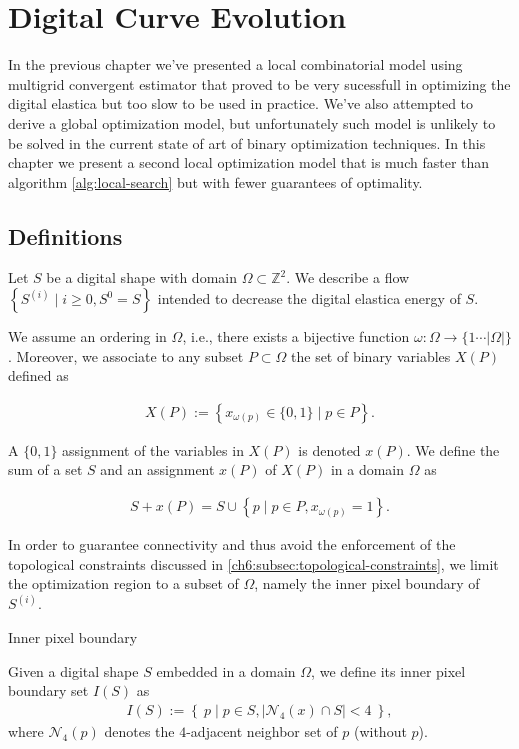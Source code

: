 \chapter{Digital Curve Evolution}
\label{chapter:digital-curve-evolution}

In the previous chapter we've presented a local combinatorial model using multigrid convergent estimator that proved to be very sucessfull in optimizing the digital elastica but too slow to be used in practice. We've also attempted to derive a global optimization model, but unfortunately such model is unlikely to be solved in the current state of art of binary optimization techniques. In this chapter we present a second local optimization model that is much faster than algorithm \ref{alg:local-search} but with fewer guarantees of optimality.

\section{Definitions}

Let $S$ be a digital shape with domain $\Omega \subset \mathbb{Z}^2$. We describe a flow $\left \{ S^{(i)} \; | \; i \geq 0, S^{0} = S \right\}$ intended to decrease the digital elastica energy of $S$.

We assume an ordering in $\Omega$, i.e., there exists a bijective function $\omega : \Omega \rightarrow \{1 \cdots |\Omega| \}$. Moreover, we associate to any subset $P \subset \Omega$ the set of binary variables $X(P)$ defined as

\begin{align*}
	X(P) := \left\{ x_{\omega(p)} \in \{0,1\} \; | \; p \in P \right\}.
\end{align*}

A $\{0,1\}$ assignment of the variables in $X(P)$ is denoted $x(P)$. We define the sum of a set $S$ and an assignment $x(P)$ of $X(P)$ in a domain $\Omega$ as

\begin{align*}
	S + x(P) = S \cup \left\{ p \; | \; p \in P, x_{\omega(p)}=1 \right\}.
\end{align*}

In order to guarantee connectivity and thus avoid the enforcement of the topological constraints discussed in \ref{ch6:subsec:topological-constraints}, we limit the optimization region to a subset of $\Omega$, namely the inner pixel boundary of  $S^{(i)}$.

\begin{definition}{Inner pixel boundary}

Given a digital shape $S$ embedded in a domain $\Omega$, we define its inner pixel boundary set $I(S)$ as
\begin{align*}
	I(S) := \left\{ \: p \; | \; p \in S, |\mathcal{N}_4(x) \cap S|<4 \: \right\},
\end{align*}
where $\mathcal{N}_4(p)$ denotes the $4$-adjacent neighbor set of $p$ (without $p$).
\end{definition}


